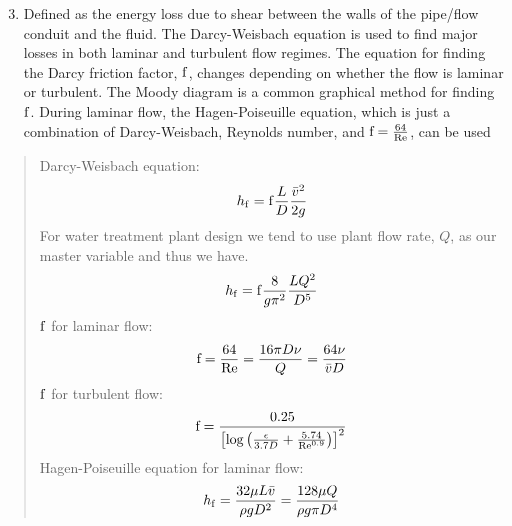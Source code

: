 \documentclass[letterpaper,10pt,english]{sphinxmanual}
\begin{document}
\begin{enumerate}
\setcounter{enumi}{2}
\item {} 
 Defined as the energy loss due to shear between the walls of the pipe/flow conduit and the fluid. The Darcy-Weisbach equation is used to find major losses in both laminar and turbulent flow regimes. The equation for finding the Darcy friction factor, \(\rm{f}\), changes depending on whether the flow is laminar or turbulent. The Moody diagram is a common graphical method for finding \(\rm{f}\). During laminar flow, the Hagen-Poiseuille equation, which is just a combination of Darcy-Weisbach, Reynolds number, and \({\rm{f}} = \frac{64}{\rm{Re}}\), can be used

\end{enumerate}
\begin{quote}

Darcy-Weisbach equation:
\begin{equation}\label{equation:Review/Review_Fluid_Mechanics:Review/Review_Fluid_Mechanics:33}
\begin{split}h_{\rm{f}} = {\rm{f}} \frac{L}{D} \frac{\bar v^2}{2g}\end{split}
\end{equation}
For water treatment plant design we tend to use plant flow rate, \(Q\), as our master variable and thus we have.
\begin{equation}\label{equation:Review/Review_Fluid_Mechanics:Review/Review_Fluid_Mechanics:34}
\begin{split}h_{\rm{f}} = {\rm{f}} \frac{8}{g \pi^2} \frac{LQ^2}{D^5}\end{split}
\end{equation}
\(\rm{f}\) for laminar flow:
\begin{equation}\label{equation:Review/Review_Fluid_Mechanics:Review/Review_Fluid_Mechanics:35}
\begin{split}{\rm{f}} = \frac{64}{\rm{Re}} = \frac{16 \pi D \nu}{Q} = \frac{64 \nu}{\bar v D}\end{split}
\end{equation}
\(\rm{f}\) for turbulent flow:
\begin{equation}\label{equation:Review/Review_Fluid_Mechanics:Review/Review_Fluid_Mechanics:36}
\begin{split}{\rm{f}} = \frac{0.25} {\left[ \log \left( \frac{\epsilon }{3.7D} + \frac{5.74}{{\rm Re}^{0.9}} \right) \right]^2}\end{split}
\end{equation}
Hagen-Poiseuille equation for laminar flow:
\begin{equation}\label{equation:Review/Review_Fluid_Mechanics:Review/Review_Fluid_Mechanics:37}
\begin{split}h_{\rm{f}} = \frac{32\mu L \bar v}{\rho gD^2} = \frac{128\mu Q}{\rho g\pi D^4}\end{split}
\end{equation}\end{quote}
\end{document}
